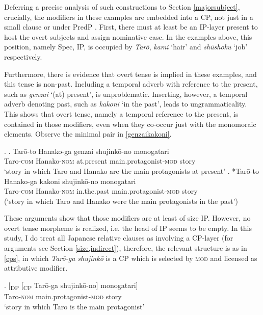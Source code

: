 Deferring a precise analysis of such constructions to Section \ref{majorsubject}, crucially, the modifiers in these examples are embedded into a CP, not just in a small clause or under PredP \citep{bowers:1993:predication}. First, there must at least be an IP-layer present to host the overt subjects and assign nominative case. In the examples above, this position, namely Spec, IP, is occupied by \textit{Tarō}, \textit{kami} `hair’ and \textit{shūshoku} `job’ respectively.

Furthermore, there is evidence that overt tense is implied in these examples, and this tense is non-past. Including a temporal adverb with reference to the present, such as \textit{genzai} `(at) present’, is unproblematic. Inserting, however, a temporal adverb denoting past, such as \textit{kakoni} `in the past’, leads to ungrammaticality. This shows that overt tense, namely a temporal reference to the present, is contained in those modifiers, even when they co-occur just with the monomoraic elements. Observe the minimal pair in \ref{genzaikakoni}.

\ex. \label{genzaikakoni} \ag. Tarō-to Hanako-ga genzai shujinkō-no monogatari\\
Taro-\textsc{com} Hanako-\textsc{nom} at.present main.protagonist-\textsc{mod} story\\
`story in which Taro and Hanako are the main protagonists at present’
 \bg. *Tarō-to Hanako-ga kakoni shujinkō-no monogatari\\
Taro-\textsc{com} Hanako-\textsc{nom} in.the.past main.protagonist-\textsc{mod} story\\
(`story in which Taro and Hanako were the main protagonists in the past’)

These arguments show that those modifiers are at least of size IP. However, no overt tense morpheme is realized, i.e. the head of IP seems to be empty. In this study, I do treat all Japanese relative clauses as involving a CP-layer (for arguments see Section \ref{size,indirect}), therefore, the relevant structure is as in \ref{cps}, in which \textit{Tarō-ga shujinkō} is a CP which is selected by \textsc{mod} and licensed as attributive modifier. %

\exg. [\textsubscript{DP} [\textsubscript{CP} Tarō-ga shujinkō-no] monogatari]\\
{} {} Taro-\textsc{nom} main.protagonist-\textsc{mod} story\\
`story in which Taro is the main protagonist' \null \hfill \citep[66]{watanabe:2010:notes} \label{cps}

